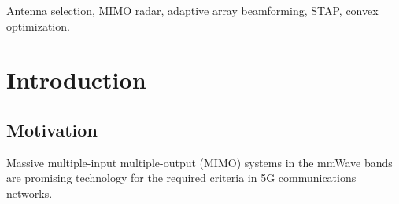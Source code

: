 \documentclass[journal]{IEEEtran}
\begin{document}
\maketitle
\begin{abstract}

\end{abstract}
\begin{IEEEkeywords}
Antenna selection, MIMO radar, adaptive array beamforming, STAP, convex optimization.
\end{IEEEkeywords}






%
\IEEEpeerreviewmaketitle
\section{Introduction}\label{intro}
\subsection{Motivation}

Massive multiple-input multiple-output (MIMO) systems in the mmWave bands are promising technology for the required criteria in 5G communications networks.
\end{document}
